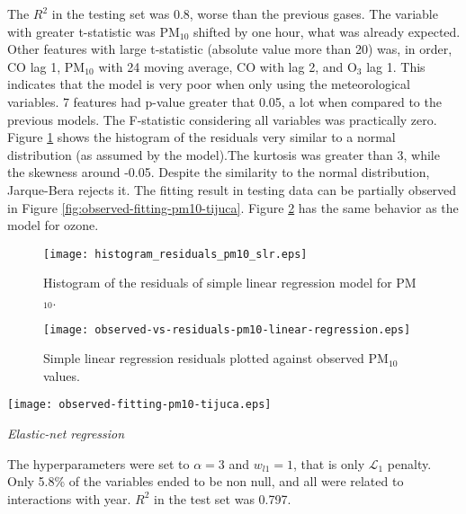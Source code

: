 The $R^2$ in the testing set was 0.8, worse than the previous gases. The
variable with greater t-statistic was PM$_{10}$ shifted by one hour, what was already expected. Other features with
large t-statistic (absolute value more than
20) was, in
order, CO lag 1, PM$_{10}$ with 24 moving average, CO with lag
2, and O$_{3}$ lag 1. This indicates that the model is very poor when only
using the meteorological variables. 7 features had p-value
greater that 0.05, a lot when compared to the previous models. The F-statistic considering all variables was practically zero. Figure \ref{fig:histogram-residuals-pm10-slr} shows
the histogram of the residuals very similar to a normal distribution (as
assumed by the model).The kurtosis was greater than 3, while the skewness around
-0.05. Despite the similarity to the normal distribution, Jarque-Bera rejects
it. The fitting result in testing data can be
partially observed in Figure \ref{fig:observed-fitting-pm10-tijuca}.  Figure
\ref{fig:observed-vs-residual-pm10-linear-regression} has the same behavior as
the model for ozone.  

\begin{figure}
    \centering
    \texttt{[image: histogram\_residuals\_pm10\_slr.eps]}
    \caption{Histogram of the residuals of simple linear regression model for PM$_{10}$.}
    \label{fig:histogram-residuals-pm10-slr}
\end{figure}

\begin{figure}[!ht]
    \centering
    \texttt{[image: observed-vs-residuals-pm10-linear-regression.eps]}
    \caption{Simple linear regression residuals plotted against
    observed PM$_{10}$ values.}
    \label{fig:observed-vs-residual-pm10-linear-regression}
\end{figure}

\begin{figure*}[!ht]
    \centering
    \texttt{[image: observed-fitting-pm10-tijuca.eps]}
    \caption{Observed and predicted PM$_{10}$ values for different months in Tijuca.}
    \label{fig:observed-fitting-pm10-tijuca}
\end{figure*}

\vspace{2mm}

{\em Elastic-net regression}

\vspace{2mm}

The hyperparameters were set to $\alpha = 3$
and $w_{l1} = 1$, that is only $\mathcal{L}_1$ penalty. Only 5.8\% of the
variables ended to be non null, and all were related to interactions with
year. $R^2$ in the test set was 0.797.

